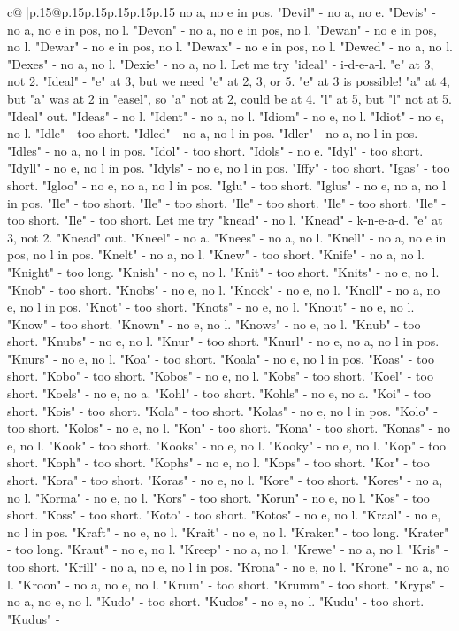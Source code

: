 \documentclass{article}
\begin{document}
{\begin{supertabular}{c@{$\;$}|p{.15\linewidth}@{}p{.15\linewidth}p{.15\linewidth}p{.15\linewidth}p{.15\linewidth}p{.15\linewidth}}
{{{no a, no e in pos. "Devil" {-} no a, no e. "Devis" {-} no a, no e in pos, no l. "Devon" {-} no a, no e in pos, no l. "Dewan" {-} no e in pos, no l. "Dewar" {-} no e in pos, no l. "Dewax" {-} no e in pos, no l. "Dewed" {-} no a, no l. "Dexes" {-} no a, no l. "Dexie" {-} no a, no l. Let me try "ideal" {-} i{-}d{-}e{-}a{-}l. "e" at 3, not 2. "Ideal" {-} "e" at 3, but we need "e" at 2, 3, or 5. "e" at 3 is possible! "a" at 4, but "a" was at 2 in "easel", so "a" not at 2, could be at 4. "l" at 5, but "l" not at 5. "Ideal" out. "Ideas" {-} no l. "Ident" {-} no a, no l. "Idiom" {-} no e, no l. "Idiot" {-} no e, no l. "Idle" {-} too short. "Idled" {-} no a, no l in pos. "Idler" {-} no a, no l in pos. "Idles" {-} no a, no l in pos. "Idol" {-} too short. "Idols" {-} no e. "Idyl" {-} too short. "Idyll" {-} no e, no l in pos. "Idyls" {-} no e, no l in pos. "Iffy" {-} too short. "Igas" {-} too short. "Igloo" {-} no e, no a, no l in pos. "Iglu" {-} too short. "Iglus" {-} no e, no a, no l in pos. "Ile" {-} too short. "Ile" {-} too short. "Ile" {-} too short. "Ile" {-} too short. "Ile" {-} too short. "Ile" {-} too short. Let me try "knead" {-} no l. "Knead" {-} k{-}n{-}e{-}a{-}d. "e" at 3, not 2. "Knead" out. "Kneel" {-} no a. "Knees" {-} no a, no l. "Knell" {-} no a, no e in pos, no l in pos. "Knelt" {-} no a, no l. "Knew" {-} too short. "Knife" {-} no a, no l. "Knight" {-} too long. "Knish" {-} no e, no l. "Knit" {-} too short. "Knits" {-} no e, no l. "Knob" {-} too short. "Knobs" {-} no e, no l. "Knock" {-} no e, no l. "Knoll" {-} no a, no e, no l in pos. "Knot" {-} too short. "Knots" {-} no e, no l. "Knout" {-} no e, no l. "Know" {-} too short. "Known" {-} no e, no l. "Knows" {-} no e, no l. "Knub" {-} too short. "Knubs" {-} no e, no l. "Knur" {-} too short. "Knurl" {-} no e, no a, no l in pos. "Knurs" {-} no e, no l. "Koa" {-} too short. "Koala" {-} no e, no l in pos. "Koas" {-} too short. "Kobo" {-} too short. "Kobos" {-} no e, no l. "Kobs" {-} too short. "Koel" {-} too short. "Koels" {-} no e, no a. "Kohl" {-} too short. "Kohls" {-} no e, no a. "Koi" {-} too short. "Kois" {-} too short. "Kola" {-} too short. "Kolas" {-} no e, no l in pos. "Kolo" {-} too short. "Kolos" {-} no e, no l. "Kon" {-} too short. "Kona" {-} too short. "Konas" {-} no e, no l. "Kook" {-} too short. "Kooks" {-} no e, no l. "Kooky" {-} no e, no l. "Kop" {-} too short. "Koph" {-} too short. "Kophs" {-} no e, no l. "Kops" {-} too short. "Kor" {-} too short. "Kora" {-} too short. "Koras" {-} no e, no l. "Kore" {-} too short. "Kores" {-} no a, no l. "Korma" {-} no e, no l. "Kors" {-} too short. "Korun" {-} no e, no l. "Kos" {-} too short. "Koss" {-} too short. "Koto" {-} too short. "Kotos" {-} no e, no l. "Kraal" {-} no e, no l in pos. "Kraft" {-} no e, no l. "Krait" {-} no e, no l. "Kraken" {-} too long. "Krater" {-} too long. "Kraut" {-} no e, no l. "Kreep" {-} no a, no l. "Krewe" {-} no a, no l. "Kris" {-} too short. "Krill" {-} no a, no e, no l in pos. "Krona" {-} no e, no l. "Krone" {-} no a, no l. "Kroon" {-} no a, no e, no l. "Krum" {-} too short. "Krumm" {-} too short. "Kryps" {-} no a, no e, no l. "Kudo" {-} too short. "Kudos" {-} no e, no l. "Kudu" {-} too short. "Kudus" {-} }}}
\end{supertabular}}
\end{document}
